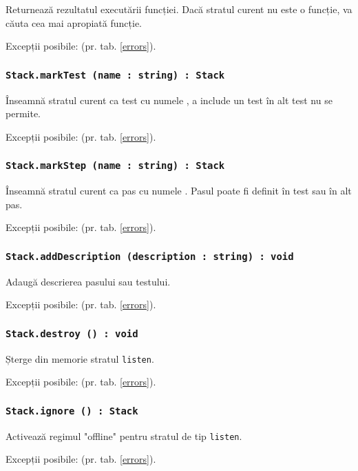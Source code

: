 Returnează rezultatul executării funcției. Dacă stratul curent nu este o funcție, va căuta cea mai apropiată funcție.

Excepții posibile:  (pr. tab. \ref{errors}).

\subsubsection{\lstinline|Stack.markTest (name : string) : Stack|}

Înseamnă stratul curent ca test cu numele , a include un test în alt test nu se permite.

Excepții posibile:  (pr. tab. \ref{errors}).

\subsubsection{\lstinline|Stack.markStep (name : string) : Stack|}

Înseamnă stratul curent ca pas cu numele . Pasul poate fi definit în test sau în alt pas.

Excepții posibile:  (pr. tab. \ref{errors}).

\subsubsection{\lstinline|Stack.addDescription (description : string) : void|}

Adaugă descrierea pasului sau testului.

Excepții posibile:  (pr. tab. \ref{errors}).

\subsubsection{\lstinline|Stack.destroy () : void|}

Șterge din memorie stratul \lstinline|listen|.

Excepții posibile:  (pr. tab. \ref{errors}).

\subsubsection{\lstinline|Stack.ignore () : Stack|}

Activează regimul "offline" pentru stratul de tip \lstinline|listen|.

Excepții posibile:  (pr. tab. \ref{errors}).


